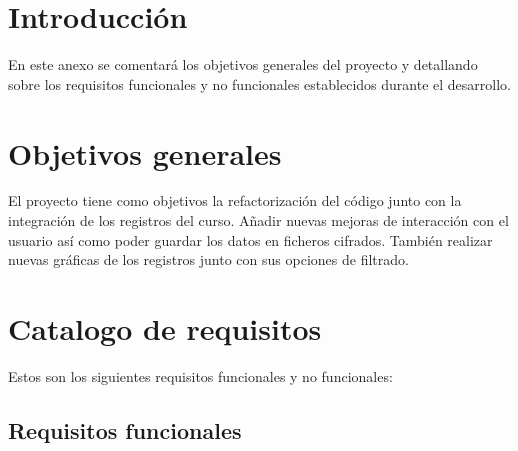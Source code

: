 
\section{Introducción}

En este anexo se comentará los objetivos generales del proyecto y detallando sobre los requisitos funcionales y no funcionales establecidos durante el desarrollo.

\section{Objetivos generales}
El proyecto tiene como objetivos la refactorización del código junto con la integración de los registros del curso. Añadir nuevas mejoras de interacción con el usuario así como poder guardar los datos en ficheros cifrados. También realizar nuevas gráficas de los registros junto con sus opciones de filtrado.

\section{Catalogo de requisitos}

Estos son los siguientes requisitos funcionales y no funcionales:

\subsection{Requisitos funcionales}

